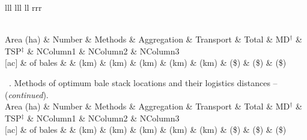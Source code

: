 \documentclass[phd,showframe]{ndsu-thesis-2022}
\newcommand\tabletopinfols{
\toprule
Area (ha) & Number  & Methods & Aggregation & Transport & Total & MD$^\dag$ & TSP$^\ddag$ & NColumn1  &  NColumn2  &  NColumn3 \\
$[$ac$]$ & of bales  &  & (km) & (km) & (km) & (km) & (km) & (\$) & (\$) & (\$) \\
    \midrule 
}
\begin{document}
\vspace{2ex}
\setlength\LTleft{0pt}
\setlength\LTright{0pt}

\begin{landscape}
{\small 
\setlength{\tabcolsep}{5.25pt}%
{\renewcommand{\arraystretch}{0.6}
\begin{ThreePartTable}
  \begin{longtable}{lll lll ll rrr}
  \caption{\normalsize A long table - spanning 3 pages - an example taken from our research group work on ``Methods of optimum bale stack locations and their logistics distances and methods combined distances.''}
  \label{tab16}\\[-2ex]     
  \tabletopinfols%
    \endfirsthead
    
{{\normalsize\tablename\ \thetable{}. Methods of optimum bale stack locations and their logistics distances  -- (\emph{continued}).}} \\[2ex]
 \tabletopinfols%
    \endhead
    
    \endfoot
    
   
    \bottomrule%
\\[-0.4in]%
 \\[-0.3in]

    \endlastfoot
        

\end{longtable}
\end{ThreePartTable}}}
\end{landscape}
\end{document}
